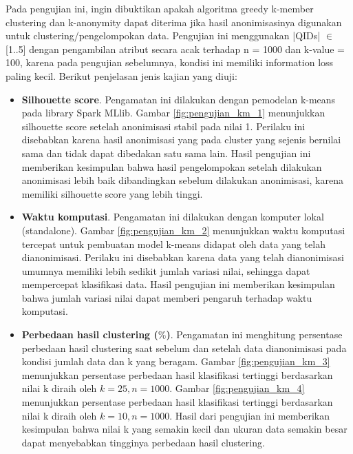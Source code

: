 \begin{minipage}[t]{15.8cm}
Pada pengujian ini, ingin dibuktikan apakah algoritma greedy k-member clustering dan k-anonymity dapat diterima jika hasil anonimisasinya digunakan untuk clustering/pengelompokan data. Pengujian ini menggunakan |QIDs| $\in$ [1..5] dengan pengambilan atribut secara acak terhadap n = 1000 dan k-value = 100, karena pada pengujian sebelumnya, kondisi ini memiliki information loss paling kecil. Berikut penjelasan jenis kajian yang diuji:
\end{minipage}

\begin{itemize}

\item \textbf{Silhouette score}. Pengamatan ini dilakukan dengan pemodelan k-means pada library Spark MLlib. Gambar \ref{fig:pengujian_km_1} menunjukkan silhouette score setelah anonimisasi stabil pada nilai 1. Perilaku ini disebabkan karena hasil anonimisasi yang pada cluster yang sejenis bernilai sama dan tidak dapat dibedakan satu sama lain. Hasil pengujian ini memberikan kesimpulan bahwa hasil pengelompokan setelah dilakukan anonimisasi lebih baik dibandingkan sebelum dilakukan anonimisasi, karena memiliki silhouette score yang lebih tinggi.

\item \textbf{Waktu komputasi}. Pengamatan ini dilakukan dengan komputer lokal (standalone). Gambar \ref{fig:pengujian_km_2} menunjukkan waktu komputasi tercepat untuk pembuatan model k-means didapat oleh data yang telah dianonimisasi. Perilaku ini disebabkan karena data yang telah dianonimisasi umumnya memiliki lebih sedikit jumlah variasi nilai, sehingga dapat mempercepat klasifikasi data. Hasil pengujian ini memberikan kesimpulan bahwa jumlah variasi nilai dapat memberi pengaruh terhadap waktu komputasi.

\item \textbf{Perbedaan hasil clustering ($\%$)}.  Pengamatan ini menghitung persentase perbedaan hasil clustering saat sebelum dan setelah data dianonimisasi pada kondisi jumlah data dan k yang beragam. Gambar \ref{fig:pengujian_km_3} menunjukkan persentase perbedaan hasil klasifikasi tertinggi berdasarkan nilai k diraih oleh $k=25,n=1000$. Gambar \ref{fig:pengujian_km_4} menunjukkan persentase perbedaan hasil klasifikasi tertinggi berdasarkan nilai k diraih oleh $k=10,n=1000$. Hasil dari pengujian ini memberikan kesimpulan bahwa nilai k yang semakin kecil dan ukuran data semakin besar dapat menyebabkan tingginya perbedaan hasil clustering.

\end{itemize}

